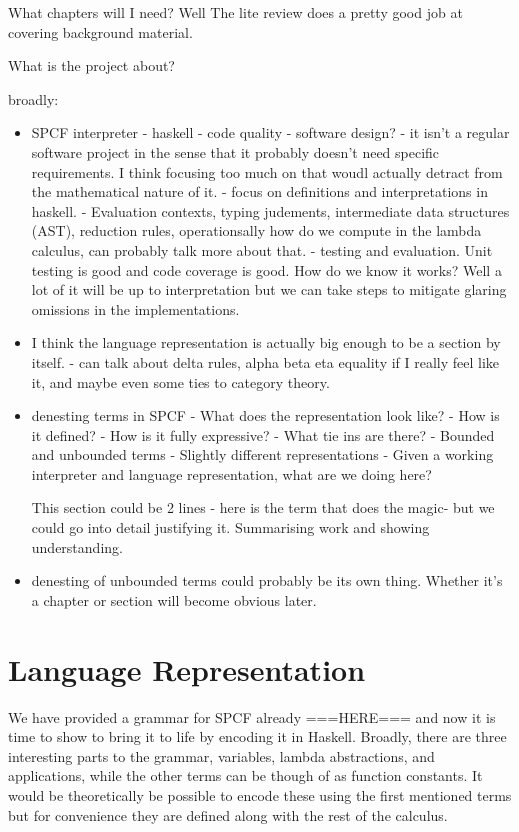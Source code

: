 \documentclass[12pt,a4paper]{report}
\theoremstyle{definition}
\theoremstyle{remark}
\begin{document}
What chapters will I need?
Well The lite review does a pretty good job at covering background material.

What is the project about?

broadly:
\begin{itemize}
    \item SPCF interpreter
        - haskell 
        - code quality
        - software design?
        - it isn't a regular software project in the sense that it probably doesn't need specific requirements. I think focusing too much on that woudl actually detract from the mathematical nature of it.
        - focus on definitions and interpretations in haskell.
        - Evaluation contexts, typing judements, intermediate data structures (AST), reduction rules, operationsally how do we compute in the lambda calculus, can probably talk more about that.
        - testing and evaluation. Unit testing is good and code coverage is good. How do we know it works? Well a lot of it will be up to interpretation but we can take steps to mitigate glaring omissions in the implementations.
    \item I think the language representation is actually big enough to be a section by itself.
        - can talk about delta rules, alpha beta eta equality if I really feel like it, and maybe even some ties to category theory.
    \item denesting terms in SPCF
        - What does the representation look like?
        - How is it defined?
        - How is it fully expressive?
        - What tie ins are there? 
        - Bounded and unbounded terms
        - Slightly different representations
        - Given a working interpreter and language representation, what are we doing here?

        This section could be 2 lines - here is the term that does the magic- but we could go into detail justifying it. Summarising work and showing understanding.
    \item denesting of unbounded terms could probably be its own thing. Whether it's a chapter or section will become obvious later.
\end{itemize}

\section{Language Representation}

We have provided a grammar for SPCF already ===HERE=== and now it is time to show to bring it to life by encoding it in Haskell. Broadly, there are three interesting parts to the grammar, variables, lambda abstractions, and applications, while the other terms can be though of as function constants. It would be theoretically be possible to encode these using the first mentioned terms but for convenience they are defined along with the rest of the calculus. 
\end{document}
